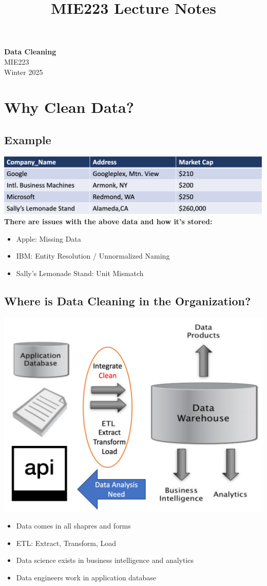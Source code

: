 \documentclass[11pt]{article}
\theoremstyle{definition}
\begin{document}
\setcounter{section}{0}
\title{MIE223 Lecture Notes}

\thispagestyle{empty}

\begin{center}
{\LARGE \bf Data Cleaning}\\
{\large MIE223}\\
Winter 2025
\end{center}

\section{Why Clean Data?}
\subsection{Example}
\includegraphics[width=\textwidth]{1.png}
\textbf{There are issues with the above data and how it's stored:}
\begin{itemize}
    \item Apple: Missing Data
    \item IBM: Entity Resolution / Unnormalized Naming
    \item Sally's Lemonade Stand: Unit Mismatch
\end{itemize}

\subsection{Where is Data Cleaning in the Organization?}
\includegraphics[width=\textwidth/2]{2.png}
\begin{itemize}
    \item Data comes in all shapres and forms
    \item ETL: Extract, Transform, Load
    \item Data science exists in business intelligence and analytics
    \item Data engineers work in application database
\end{itemize}
\end{document}
